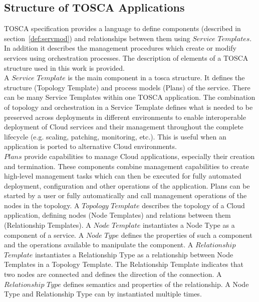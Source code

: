\subsection*{Structure of TOSCA Applications}
TOSCA specification provides a language to define components (described in section~\ref{def:servmod}) and relationships between them using $Service$ $Templates$. 
In addition it describes the management procedures which create or modify services using orchestration processes.
The description of elements of a TOSCA structure used in this work is provided. \\
A $Service$ $Template$ is the main component in a \gls{tosca} structure. 
It defines the structure (Topology Template) and process models (Plans) of the service. 
There can be many Service Templates within one TOSCA application.
The combination of topology and orchestration in a Service Template defines what is needed to be preserved across deployments in different environments to enable interoperable deployment of Cloud services and their management throughout the complete lifecycle (e.g. scaling, patching, monitoring, etc.).
This is useful when an application is ported to alternative Cloud environments.~\cite{TOSCA-v1.0_book} \\ %
$Plans$ provide capabilities to manage Cloud applications, especially their creation and termination.
These components combine management capabilities to create high-level management tasks which can then be executed for fully automated deployment, configuration and other operations of the application.
Plans can be started by a user or fully automatically and call management operations of the nodes in the topology. %
A $Topology$ $Template$ describes the topology of a Cloud application, defining nodes (Node Templates) and relations between them (Relationship Templates). %
A $Node$ $Template$ instantiates a Node Type as a component of a service. 
A $Node$ $Type$ defines the properties of such a component and the operations available to manipulate the component.
A $Relationship$ $Template$ instantiates a Relationship Type as a relationship between Node Templates in a Topology Template. 
The Relationship Template indicates that two nodes are connected and defines the direction of the connection.
A $Relationship$ $Type$ defines semantics and properties of the relationship.\label{subs:reltype} %
A Node Type and Relationship Type can by instantiated multiple times.
